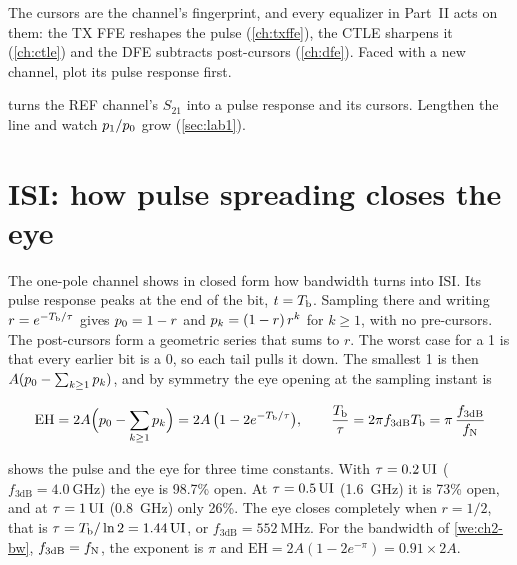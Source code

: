 \begin{insight}
The cursors are the channel's fingerprint, and every equalizer in Part~II acts on them: the TX FFE reshapes the pulse (\cref{ch:txffe}), the CTLE sharpens it (\cref{ch:ctle}) and the DFE subtracts post-cursors (\cref{ch:dfe}). Faced with a new channel, plot its pulse response first.
\end{insight}

\begin{tryit}
 turns the REF channel's $S_{21}$ into a pulse response and its cursors. Lengthen the line and watch $p_{1}/p_{0}$ grow (\cref{sec:lab1}).
\end{tryit}

\section{ISI: how pulse spreading closes the eye}\label{sec:ch2-isi}
The one-pole channel shows in closed form how bandwidth turns into ISI. Its pulse response peaks at the end of the bit, $t = T_\mathrm{b}$. Sampling there and writing $r = e^{-T_\mathrm{b}/\tau}$ gives $p_{0} = 1 - r$ and $p_{k} = (1-r)\,r^{k}$ for $k \ge 1$, with no pre-cursors. The post-cursors form a geometric series that sums to $r$. The worst case for a 1 is that every earlier bit is a 0, so each tail pulls it down. The smallest 1 is then $A(p_{0} - \sum_{k\ge1}p_{k})$, and by symmetry the eye opening at the sampling instant is

\begin{keyeq}
\begin{equation}
  \mathrm{EH} = 2A\Bigl(p_{0} - \sum_{k\ge1}p_{k}\Bigr) = 2A\,\bigl(1 - 2e^{-T_\mathrm{b}/\tau}\bigr), \qquad \frac{T_\mathrm{b}}{\tau} = 2\pi f_\mathrm{3dB}T_\mathrm{b} = \pi\,\frac{f_\mathrm{3dB}}{f_\mathrm{N}}
  \label{eq:ch2-onepole-eye}
\end{equation}
\end{keyeq}

 shows the pulse and the eye for three time constants. With $\tau = 0.2\,\mathrm{UI}$ ($f_\mathrm{3dB} = \qty{4.0}{\giga\hertz}$) the eye is 98.7\% open. At $\tau = 0.5\,\mathrm{UI}$ (\qty{1.6}{\giga\hertz}) it is 73\% open, and at $\tau = 1\,\mathrm{UI}$ (\qty{0.8}{\giga\hertz}) only 26\%. The eye closes completely when $r = 1/2$, that is $\tau = T_\mathrm{b}/\ln 2 = 1.44\,\mathrm{UI}$, or $f_\mathrm{3dB} = \qty{552}{\mega\hertz}$. For the bandwidth of \cref{we:ch2-bw}, $f_\mathrm{3dB} = f_\mathrm{N}$, the exponent is $\pi$ and $\mathrm{EH} = 2A(1 - 2e^{-\pi}) = 0.91 \times 2A$.

